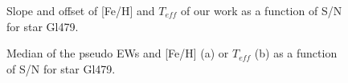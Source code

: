 \documentclass{aa}
\begin{document}
\begin{figure}[]
\caption{ Slope and offset of [Fe/H] and $T_{eff}$ of our work as a function of S/N for star Gl479.}
\label{fig:fit}
\end{figure}
\begin{figure}[]
\centering
{}
\caption{Median of the pseudo EWs and [Fe/H] (a) or $T_{eff}$ (b) as a function of S/N for star Gl479.}
\label{fig:ewsnr}
\end{figure}
\end{document}
